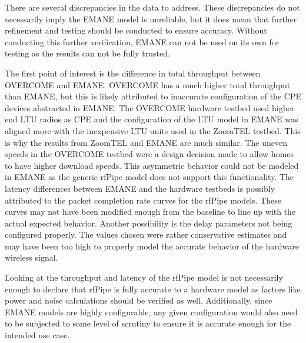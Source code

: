 There are several discrepancies in the data to address.
These discrepancies do not necessarily imply the EMANE model is unreliable, but it does mean that further refinement and testing should be conducted to ensure accuracy.
Without conducting this further verification, EMANE can not be used on its own for testing as the results can not be fully trusted.\par
The first point of interest is the difference in total throughput between OVERCOME and EMANE.
OVERCOME has a much higher total throughput than EMANE, but this is likely attributed to inaccurate configuration of the CPE devices abstracted in EMANE.
The OVERCOME hardware testbed used higher end LTU radios as CPE and the configuration of the LTU model in EMANE was aligned more with the inexpensive LTU units used in the ZoomTEL testbed.
This is why the results from ZoomTEL and EMANE are much similar.
The uneven speeds in the OVERCOME testbed were a design decision made to allow homes to have higher download speeds.
This asymmetric behavior could not be modeled in EMANE as the generic rfPipe model does not support this functionality.
The latency differences between EMANE and the hardware testbeds is possibly attributed to the packet completion rate curves for the rfPipe models.
These curves may not have been modified enough from the baseline to line up with the actual expected behavior.
Another possibility is the delay parameters not being configured properly.
The values chosen were rather conservative estimates and may have been too high to properly model the accurate behavior of the hardware wireless signal.\par
Looking at the throughput and latency of the rfPipe model is not necessarily enough to declare that rfPipe is fully accurate to a hardware model as factors like power and noise calculations should be verified as well.
Additionally, since EMANE models are highly configurable, any given configuration would also need to be subjected to some level of scrutiny to ensure it is accurate enough for the intended use case.

